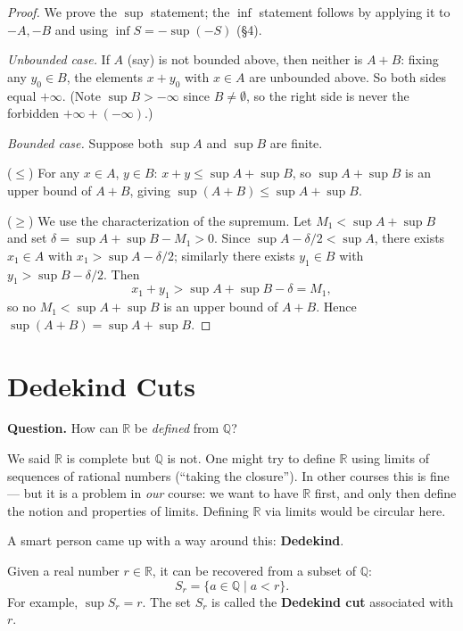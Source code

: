 \documentclass[11pt]{report}
\begin{document}
\begin{proof}
We prove the $\sup$ statement; the $\inf$ statement follows by applying it to $-A, -B$ and using $\inf S = -\sup(-S)$ (\S 4).

\emph{Unbounded case.} If $A$ (say) is not bounded above, then neither is $A + B$: fixing any $y_0 \in B$, the elements $x + y_0$ with $x \in A$ are unbounded above. So both sides equal $+\infty$. (Note $\sup B > -\infty$ since $B \neq \emptyset$, so the right side is never the forbidden $+\infty + (-\infty)$.)

\emph{Bounded case.} Suppose both $\sup A$ and $\sup B$ are finite. 

($\leq$) For any $x \in A$, $y \in B$: $x + y \leq \sup A + \sup B$, so $\sup A + \sup B$ is an upper bound of $A + B$, giving $\sup(A+B) \leq \sup A + \sup B$.

($\geq$) We use the characterization of the supremum. Let $M_1 < \sup A + \sup B$ and set $\delta = \sup A + \sup B - M_1 > 0$. Since $\sup A - \delta/2 < \sup A$, there exists $x_1 \in A$ with $x_1 > \sup A - \delta/2$; similarly there exists $y_1 \in B$ with $y_1 > \sup B - \delta/2$. Then
\[
x_1 + y_1 > \sup A + \sup B - \delta = M_1,
\]
so no $M_1 < \sup A + \sup B$ is an upper bound of $A + B$. Hence $\sup(A+B) = \sup A + \sup B$.
\end{proof}


\section{Dedekind Cuts}

\textbf{Question.} How can $\mathbb{R}$ be \emph{defined} from $\mathbb{Q}$?

We said $\mathbb{R}$ is complete but $\mathbb{Q}$ is not. One might try to define $\mathbb{R}$ using limits of sequences of rational numbers (``taking the closure''). In other courses this is fine --- but it is a problem in \emph{our} course: we want to have $\mathbb{R}$ first, and only then define the notion and properties of limits. Defining $\mathbb{R}$ via limits would be circular here.

A smart person came up with a way around this: \textbf{Dedekind}.

\begin{defbox}
Given a real number $r \in \mathbb{R}$, it can be recovered from a subset of $\mathbb{Q}$:
\[
S_r = \{a \in \mathbb{Q} \mid a < r\}.
\]
For example, $\sup S_r = r$. The set $S_r$ is called the \textbf{Dedekind cut} associated with $r$.
\end{defbox}
\end{document}
